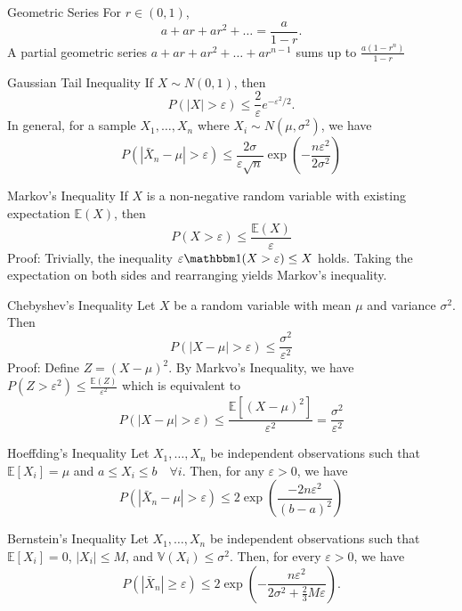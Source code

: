 \documentclass[avery5371,grid]{flashcards}
\begin{document}
\begin{flashcard}[Theorem]{Geometric Series}
For $r \in (0,1)$, 
\[a + ar + ar^2 + \ldots = \frac{a}{1-r}.\] A partial geometric series $a + ar + ar^2 + \ldots + ar^{n-1}$ sums up to $\frac{a(1-r^n)}{1-r}$
\end{flashcard}


\begin{flashcard}[Theorem]{Gaussian Tail Inequality}
If $X \sim N(0,1)$, then 
\[
P(|X|>\varepsilon) \le \frac{2}{\varepsilon}e^{-\varepsilon^2/2}.
\]
In general, for a sample $X_1, \ldots, X_n$ where $X_i \sim N\left(\mu,\sigma^2\right)$, we have
\[
P\left(\left|\bar X_n - \mu \right| > \varepsilon \right) \le \frac{2\sigma}{\varepsilon \sqrt{n}} \exp \left( - \frac{n\varepsilon^2}{2\sigma^2} \right)
\]
\end{flashcard}

\begin{flashcard}[Theorem]{Markov's Inequality}
If $X$ is a non-negative random variable with existing expectation $\mathbb{E}(X)$, then
\[
P\left(X > \varepsilon \right) \le \frac{\mathbb E (X)}{\varepsilon}
\]
Proof:
Trivially, the inequality $\varepsilon \mathbbm 1 (X > \varepsilon) \le X$ holds. Taking the expectation on both sides and rearranging yields Markov's inequality.
\end{flashcard}

\begin{flashcard}[Theorem]{Chebyshev's Inequality}
Let $X$ be a random variable with mean $\mu$ and variance $\sigma^2$. Then
\[
P\left(\left|X-\mu\right| > \varepsilon\right) \le \frac{\sigma^2}{\varepsilon^2}
\]
Proof:
Define $ Z = (X - \mu)^2$. By Markvo's Inequality, we have $P ( Z > \varepsilon^2) \le \frac{\mathbb{E}(Z)}{\varepsilon^2}$
which is equivalent to 
\[
P\left(\left| X - \mu \right| > \varepsilon\right) \le \frac{\mathbb{E}\left[\left(X-\mu\right)^2\right]}{\varepsilon^2} = \frac{\sigma^2}{\varepsilon^2}
\]
\end{flashcard}

\begin{flashcard}[Theorem]{Hoeffding's Inequality}
Let $X_1, \ldots,X_n$ be independent observations such that $\mathbb{E}[X_i] = \mu$ and $a \le X_i \le b \quad \forall i$. Then, for any $\varepsilon > 0$, we have
\[
P\left(\left|\bar X_n - \mu \right| > \varepsilon\right) \le 2\exp\left( \frac{-2n\varepsilon^2}{(b-a)^2}  \right)
\]
\end{flashcard}

\begin{flashcard}[Theorem]{Bernstein's Inequality}
Let $X_1, \ldots, X_n$ be independent observations such that $\mathbb{E}[X_i] = 0$, $|X_i| \le M$, and $\mathbb{V}(X_i) \le \sigma^2$. Then, for every $\varepsilon > 0$, we have
\[
P\left(\left|\bar X_n \right| \ge \varepsilon\right) \le 2 \exp\left(-\frac{n\varepsilon^2}{2\sigma^2+\frac{2}{3}M\varepsilon}\right).
\]
\end{flashcard}
\end{document}
